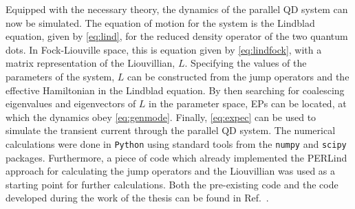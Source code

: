 \documentclass[../main.tex]{subfiles}
\begin{document}
Equipped with the necessary theory, the dynamics of the parallel QD system can now be simulated. The equation of motion for the system is the Lindblad equation, given by \cref{eq:lind}, for the reduced density operator of the two quantum dots. In Fock-Liouville space, this is equation given by \cref{eq:lindfock}, with a matrix representation of the Liouvillian, $L$. Specifying the values of the parameters of the system, $L$ can be constructed from the jump operators and the effective Hamiltonian in the Lindblad equation. By then searching for coalescing eigenvalues and eigenvectors of $L$ in the parameter space, EPs can be located, at which the dynamics obey \cref{eq:genmode}. Finally, \cref{eq:expec} can be used to simulate the transient current through the parallel QD system. The numerical calculations were done in \verb+Python+ using standard tools from the \verb+numpy+ and \verb+scipy+ packages. Furthermore, a piece of code which already implemented the PERLind approach for calculating the jump operators and the Liouvillian was used as a starting point for further calculations. Both the pre-existing code and the code developed during the work of the thesis can be found in Ref.~\cite{git}.
\end{document}

